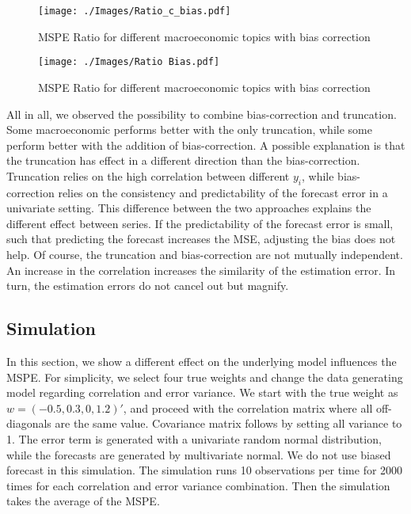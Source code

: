 \documentclass[11pt]{article}
\begin{document}
\begin{figure}[!h]
	\centering
	\texttt{[image: ./Images/Ratio\_c\_bias.pdf]}
	\caption{MSPE Ratio for different macroeconomic topics with bias correction}\label{fig: Ratio bias}
\end{figure}


\begin{figure}[!h]
	\centering
	\texttt{[image: ./Images/Ratio Bias.pdf]}
	\caption{MSPE Ratio for different macroeconomic topics with bias correction}\label{fig: Ratio bias}
\end{figure}


All in all, we observed the possibility to combine bias-correction and truncation. Some macroeconomic performs better with the only truncation, while some perform better with the addition of bias-correction. A possible explanation is that the truncation has effect in a different direction than the bias-correction. Truncation relies on the high correlation between different $y_i$, while bias-correction relies on the consistency and predictability of the forecast error in a univariate setting. This difference between the two approaches explains the different effect between series. If the predictability of the forecast error is small, such that predicting the forecast increases the MSE, adjusting the bias does not help. Of course, the truncation and bias-correction are not mutually independent. An increase in the correlation increases the similarity of the estimation error. In turn, the estimation errors do not cancel out but magnify. 



\subsection{Simulation}\label{simulation}
In this section, we show a different effect on the underlying model influences the MSPE. For simplicity, we select four true weights and change the data generating model regarding correlation and error variance. We start with the true weight as $w=(-0.5,0.3,0,1.2)'$, and proceed with the correlation matrix where all off-diagonals are the same value. Covariance matrix follows by setting all variance to 1. The error term is generated with a univariate random normal distribution, while the forecasts are generated by multivariate normal. We do not use biased forecast in this simulation. The simulation runs 10 observations per time for 2000 times for each correlation and error variance combination. Then the simulation takes the average of the MSPE.
\end{document}

